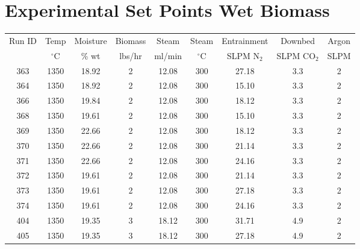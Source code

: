 \documentclass[11pt,twocolumn]{article}
\begin{document}
\newpage
\section{Experimental Set Points Wet Biomass}
\label{app_wet_sp}

\begin{center}
\begin{tabular}{ccccccccc}
\toprule
Run ID &  Temp 		&  Moisture 	&  Biomass 	&  Steam 	&  Steam 		&  Entrainment & Downbed	 & Argon \\
{}       & $^\circ$C	& \% wt		& lbs/hr		& ml/min	& $^\circ$C	& SLPM N$_2$	& SLPM CO$_2$	 & SLPM \\
\midrule
363    &       1350 &     18.92 &             2 &     12.08 &       300 &       27.18 &                3.3 &           2 \\
364    &       1350 &     18.92 &             2 &     12.08 &       300 &       15.10 &                3.3 &           2 \\
366    &       1350 &     19.84 &             2 &     12.08 &       300 &       18.12 &                3.3 &           2 \\
368    &       1350 &     19.61 &             2 &     12.08 &       300 &       15.10 &                3.3 &           2 \\
369    &       1350 &     22.66 &             2 &     12.08 &       300 &       18.12 &                3.3 &           2 \\
370    &       1350 &     22.66 &             2 &     12.08 &       300 &       21.14 &                3.3 &           2 \\
371    &       1350 &     22.66 &             2 &     12.08 &       300 &       24.16 &                3.3 &           2 \\
372    &       1350 &     19.61 &             2 &     12.08 &       300 &       21.14 &                3.3 &           2 \\
373    &       1350 &     19.61 &             2 &     12.08 &       300 &       27.18 &                3.3 &           2 \\
374    &       1350 &     19.61 &             2 &     12.08 &       300 &       24.16 &                3.3 &           2 \\
404    &       1350 &     19.35 &             3 &     18.12 &       300 &       31.71 &                4.9 &           2 \\
405    &       1350 &     19.35 &             3 &     18.12 &       300 &       27.18 &                4.9 &           2 \\

\end{tabular}
\end{center}
\end{document}

